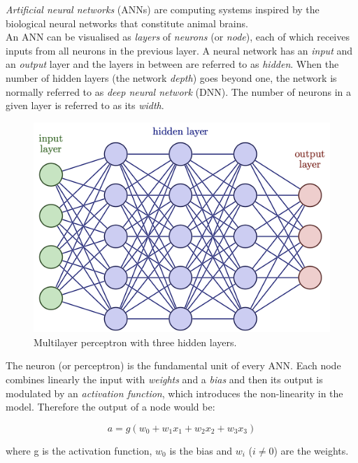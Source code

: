 \textit{Artificial neural networks} (ANNs) are computing systems inspired by the biological neural networks that constitute animal brains.\\
An ANN can be visualised as \textit{layers} of \textit{neurons} (or \textit{node}), each of which receives inputs from all neurons in the previous layer.
A neural network has an \textit{input} and an \textit{output} layer and the layers in between are referred to as \textit{hidden}.
When the number of hidden layers (the network \textit{depth}) goes beyond one, the network is normally referred to as \textit{deep neural network} (DNN). 
The number of neurons in a given layer is referred to as its \textit{width}.

\begin{figure}[h]
\centering
\includegraphics[scale=0.5]{Chapters/Chapter2/foto.png}
\caption{Multilayer perceptron with three hidden layers.}
\end{figure}

The neuron (or perceptron) is the fundamental unit of every ANN.
Each node combines linearly the input with \textit{weights} and a \textit{bias} and then its output is modulated by an \textit{activation function}, which introduces the non-linearity in the model.
Therefore the output of a node would be:

\begin{equation}
a = g(w_{0} + w_{1} x_1 + w_{2} x_2 + w_{3} x_3)
\end{equation}

where g is the activation function, $w_{0}$ is the bias and $w_{i}$ ($i \ne 0$) are the weights.


